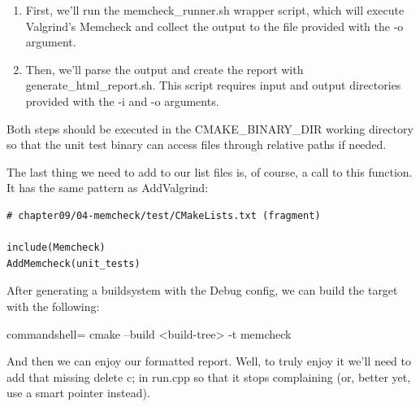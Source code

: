 \begin{enumerate}
\item 
First, we'll run the memcheck\_runner.sh wrapper script, which will execute Valgrind's Memcheck and collect the output to the file provided with the -o argument.

\item 
Then, we'll parse the output and create the report with generate\_html\_report.sh. This script requires input and output directories provided with the -i and -o arguments.
\end{enumerate}

Both steps should be executed in the CMAKE\_BINARY\_DIR working directory so that the unit test binary can access files through relative paths if needed.

The last thing we need to add to our list files is, of course, a call to this function. It has the same pattern as AddValgrind:

\begin{lstlisting}[style=styleCMake]
# chapter09/04-memcheck/test/CMakeLists.txt (fragment)

include(Memcheck)
AddMemcheck(unit_tests)
\end{lstlisting}

After generating a buildsystem with the Debug config, we can build the target with the following:

\begin{tcblisting}{commandshell={}}
cmake --build <build-tree> -t memcheck
\end{tcblisting}

And then we can enjoy our formatted report. Well, to truly enjoy it we'll need to add that missing delete c; in run.cpp so that it stops complaining (or, better yet, use a smart pointer instead).








